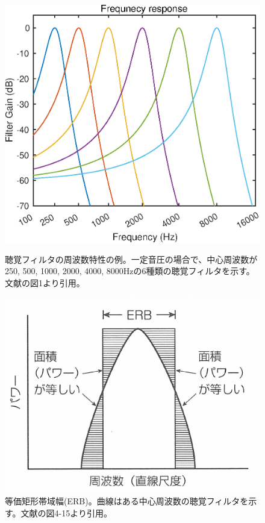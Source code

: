 \begin{figure}[h]
    \begin{minipage}[c]{0.45\hsize}
    \vspace{50pt}
    \centering
    \includegraphics[width=\hsize]{Figure/RelatedResearch/DemoAF_Basic_FilterBank.eps}
    \caption{聴覚フィルタの周波数特性の例。一定音圧の場合で、中心周波数が250, 500, 1000, 2000, 4000, 8000Hzの6種類の聴覚フィルタを示す。文献\cite{irino2010hajimete}の図1より引用。}
    \label{fig:Basic_FilterBank}
    \end{minipage}
    \hspace{0.1\hsize}
    \begin{minipage}[c]{0.45\hsize}
    \vspace{50pt}
    \centering
    \includegraphics[width=1.08\hsize]{Figure/RelatedResearch/Ogushi2019ERB.eps}
    \caption{等価矩形帯域幅(ERB)。曲線はある中心周波数の聴覚フィルタを示す。文献\cite{ogushi2019Book}の図4-15より引用。}
    \label{fig:ERB}
    \end{minipage}
\end{figure}
